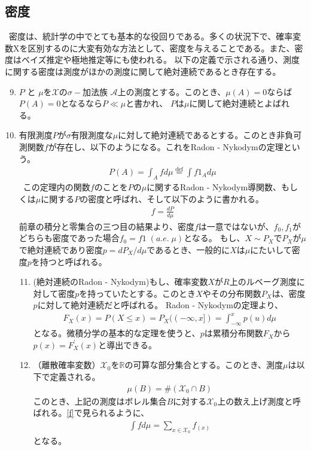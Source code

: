 \documentclass[a4j,12pt]{jarticle}
\begin{document}
\subsection{密度}
\ 密度は、統計学の中でとても基本的な役回りである。多くの状況下で、確率変数Xを区別するのに大変有効な方法として、密度を与えることである。また、密度はベイズ推定や極地推定等にも使われる。
以下の定義で示される通り、測度に関する密度は測度がほかの測度に関して絶対連続であるとき存在する。
\begin{enumerate}[label = 定義1.\arabic*.]
\setcounter{enumi}{8}
\item $P$ と $\mu$を$\mathcal{X}$の$\sigma-加法族$ $\mathcal{A}$上の測度とする。このとき、$\mu(A) = 0$ならば$P(A) = 0$となるなら$P \ll \mu$と書かれ、 $P$は$\mu$に関して絶対連続とよばれる。
\end{enumerate}
\begin{enumerate}[label = 定理1.\arabic* ]
\setcounter{enumi}{9}
\item 有限測度$P$が$\sigma$有限測度な$\mu$に対して絶対連続であるとする。このとき非負可測関数$f$が存在し、以下のようになる。これをRadon - Nykodymの定理という。
\begin{align*}
P(A) = \int_{A}f d\mu \stackrel{\mathrm{def}}{=} \int f 1_{A} d\mu
\end{align*}
\ この定理内の関数$f$のことを$Pの\mu$に関するRadon - Nykodym導関数、もしくは$\mu$に関する$P$の密度と呼ばれ、そして以下のように書かれる。
\begin{align*}
f = \frac{dP}{d\mu}
\end{align*}
前章の積分と零集合の三つ目の結果より、密度$f$は一意ではないが、$f_{0},f_{1}$がどちらも密度であった場合$f_{0} = f{1}\;(a.e.\; \mu)$となる。
もし、$X \sim P_{X}$で$P_{X}$が$\mu$で絶対連続であり密度$p =dP_{X}/d\mu$であるとき、一般的に$X$は$\mu$にたいして密度$p$を持つと呼ばれる。
\begin{enumerate}[label = 例1.\arabic*]
\setcounter{enumii}{10}
\item (絶対連続のRadon - Nykodym)もし、確率変数$X$が$R$上のルベーグ測度に対して密度$p$を持っていたとする。このとき$X$やその分布関数$P_{X}$は、密度$p$に対して絶対連続だと呼ばれる。
Radon - Nykodymの定理より、
\begin{align*}
F_{X}(x) = P(X \leq x) = P_{X}((-\infty,x]) = \int_{-\infty}^{x} p(u) d\mu
\end{align*}
となる。微積分学の基本的な定理を使うと、$p$は累積分布関数$F_{X}$から$p(x) = F_{X}^{'}(x)$と導出できる。
\item （離散確率変数）$\mathcal{X}_{0}$を$\mathbb{R}$の可算な部分集合とする。このとき、測度$\mu$は以下で定義される。
\begin{align*}
\mu(B) = \#(\mathcal{X}_{0} \cap B)
\end{align*}
このとき、上記の測度はボレル集合$B$に対する$\mathcal{X}_{0}$上の数え上げ測度と呼ばれる。\ref{f}で見られるように、
\begin{align*}
\int f d\mu = \sum_{x \in \mathcal{X}_{0}}f_(x)
\end{align*}
となる。
\end{enumerate}
\end{enumerate}
\end{document}
